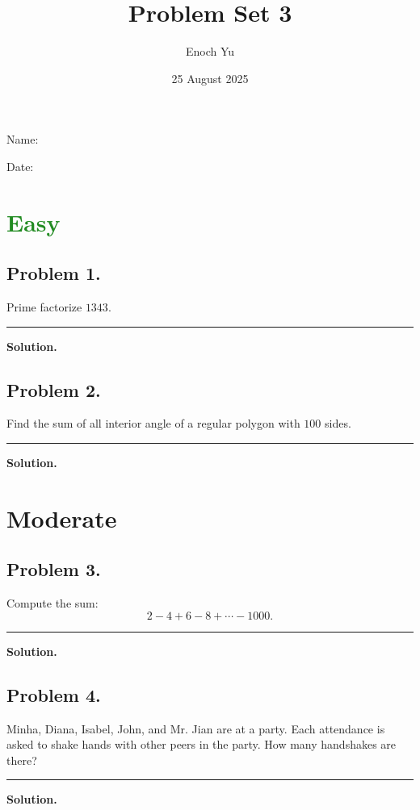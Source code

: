 \documentclass{article}
\title{Problem Set 3}
\author{Enoch Yu}
\date{25 August 2025}
\newcommand {\MyLine} {
    \smallskip \noindent\rule{\textwidth}{0.4pt} \smallskip
}
\begin{document}
Name:

Date:

\section*{\textcolor{ForestGreen}{Easy}}
\begin{minipage}[t][0.4\textheight][t]{\textwidth}
\subsection*{Problem 1.} %
{\color {Gray}
Prime factorize $1343$.
}

\MyLine

\textbf{Solution.}

\end{minipage}


\begin{minipage}[t][0.4\textheight][t]{\textwidth}
\subsection*{Problem 2.} %
{\color {Gray}
Find the sum of all interior angle of a regular
polygon with $100$ sides.
}

\MyLine

\textbf{Solution.}

\end{minipage}


\newpage
\section*{\textcolor{YellowOrange}{Moderate}}
\begin{minipage}[t][0.45\textheight][t]{\textwidth}
\subsection*{Problem 3.} %
{\color {Gray}
Compute the sum:
\[
2 - 4 + 6 - 8 + \cdots - 1000.
\]
}

\MyLine

\textbf{Solution.}

\end{minipage}

\begin{minipage}[t][0.45\textheight][t]{\textwidth}

\subsection*{Problem 4.} %
{\color {Gray}
Minha, Diana, Isabel, John, and Mr. Jian are at a
party. Each attendance is asked to shake hands with
other peers in the party. How many handshakes are
there?
}

\MyLine

\textbf{Solution.}

\end{minipage}
\end{document}
